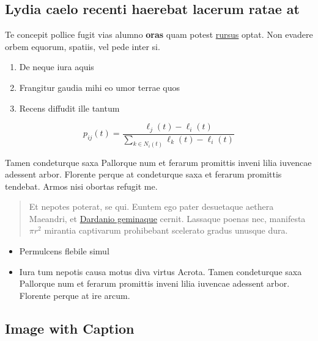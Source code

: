 \hypertarget{lydia-caelo-recenti-haerebat-lacerum-ratae-at}{%
\subsection{Lydia caelo recenti haerebat lacerum ratae
at}\label{lydia-caelo-recenti-haerebat-lacerum-ratae-at}}

Te concepit pollice fugit vias alumno \textbf{oras} quam potest
\href{http://example.com\#rursus}{rursus} optat. Non evadere orbem
equorum, spatiis, vel pede inter si.

\begin{enumerate}
\def\labelenumi{\arabic{enumi}.}
\tightlist
\item
  De neque iura aquis
\item
  Frangitur gaudia mihi eo umor terrae quos
\item
  Recens diffudit ille tantum
\end{enumerate}

\begin{equation}\label{eq:neighbor-propability}
    p_{ij}(t) = \frac{\ell_j(t) - \ell_i(t)}{\sum_{k \in N_i(t)}^{} \ell_k(t) - \ell_i(t)}
\end{equation}

Tamen condeturque saxa Pallorque num et ferarum promittis inveni lilia
iuvencae adessent arbor. Florente perque at condeturque saxa et ferarum
promittis tendebat. Armos nisi obortas refugit me.

\begin{quote}
Et nepotes poterat, se qui. Euntem ego pater desuetaque aethera
Maeandri, et \href{http://example.com\#Dardanio_geminaque}{Dardanio
geminaque} cernit. Lassaque poenas nec, manifesta \(\pi r^2\) mirantia
captivarum prohibebant scelerato gradus unusque dura.
\end{quote}

\begin{itemize}
\tightlist
\item
  Permulcens flebile simul
\item
  Iura tum nepotis causa motus diva virtus Acrota. Tamen condeturque
  saxa Pallorque num et ferarum promittis inveni lilia iuvencae adessent
  arbor. Florente perque at ire arcum.
\end{itemize}

\hypertarget{image-with-caption}{%
\subsection{Image with Caption}\label{image-with-caption}}

